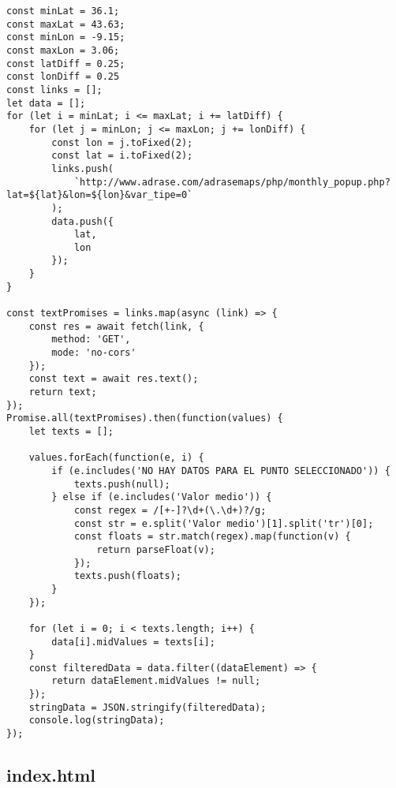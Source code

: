 \begin{lstlisting}[style=ES6, caption={public/scripts/generateLinks.js}]
const minLat = 36.1;
const maxLat = 43.63;
const minLon = -9.15;
const maxLon = 3.06;
const latDiff = 0.25;
const lonDiff = 0.25
const links = [];
let data = [];
for (let i = minLat; i <= maxLat; i += latDiff) {
	for (let j = minLon; j <= maxLon; j += lonDiff) {
		const lon = j.toFixed(2);
		const lat = i.toFixed(2);
		links.push(
			`http://www.adrase.com/adrasemaps/php/monthly_popup.php?lat=${lat}&lon=${lon}&var_tipe=0`
		);
		data.push({
			lat,
			lon
		});
	}
}

const textPromises = links.map(async (link) => {
	const res = await fetch(link, {
		method: 'GET',
		mode: 'no-cors'
	});
	const text = await res.text();
	return text;
});
Promise.all(textPromises).then(function(values) {
	let texts = [];

	values.forEach(function(e, i) {
		if (e.includes('NO HAY DATOS PARA EL PUNTO SELECCIONADO')) {
			texts.push(null);
		} else if (e.includes('Valor medio')) {
			const regex = /[+-]?\d+(\.\d+)?/g;
			const str = e.split('Valor medio')[1].split('tr')[0];
			const floats = str.match(regex).map(function(v) {
				return parseFloat(v);
			});
			texts.push(floats);
		}
	});

	for (let i = 0; i < texts.length; i++) {
		data[i].midValues = texts[i];
	}
	const filteredData = data.filter((dataElement) => {
		return dataElement.midValues != null;
	});
	stringData = JSON.stringify(filteredData);
	console.log(stringData);
});

\end{lstlisting}

\subsection{index.html}


